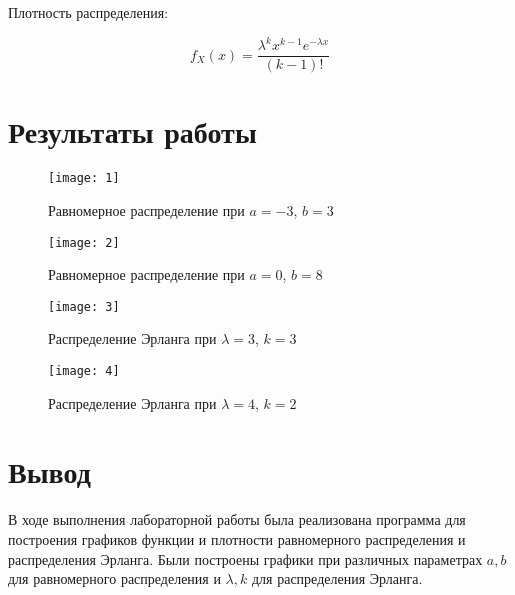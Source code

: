 \documentclass[a4paper, 14pt]{article}
\begin{document}
Плотность распределения:

\begin{equation*}
f_X(x) = \frac{\lambda^k x^{k-1} e^{-\lambda x} } {(k-1)!}
\end{equation*}


\section*{Результаты работы}

\begin{figure}[H]
    \texttt{[image: 1]}
    \caption{Равномерное распределение при $a=-3$, $b=3$}
    \label{fig:}
\end{figure}

\begin{figure}[H]
    \texttt{[image: 2]}
    \caption{Равномерное распределение при $a=0$, $b=8$}
    \label{fig:}
\end{figure}

\begin{figure}[H]
    \texttt{[image: 3]}
    \caption{Распределение Эрланга при $\lambda=3$, $k=3$}
    \label{fig:}
\end{figure}

\begin{figure}[H]
    \texttt{[image: 4]}
    \caption{Распределение Эрланга при $\lambda=4$, $k=2$}
    \label{fig:}
\end{figure}

\section*{Вывод}
В ходе выполнения лабораторной работы была реализована программа для построения графиков функции и плотности равномерного распределения и распределения Эрланга. Были построены графики при различных параметрах $a, b$ для равномерного распределения и $\lambda, k$ для распределения Эрланга.
\end{document}
